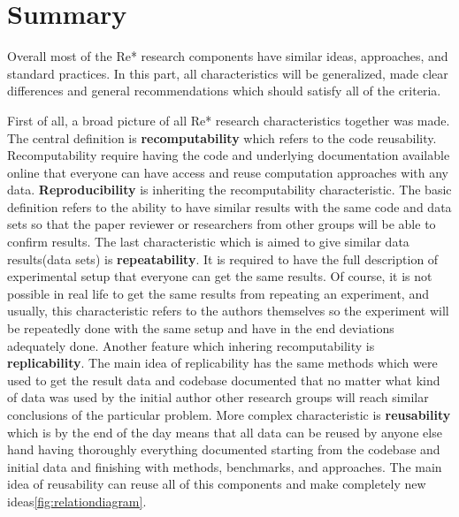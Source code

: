 \chapter{Summary}
Overall most of the Re* research components have similar ideas, approaches, and standard practices. In this part, all characteristics will be generalized, made clear differences and general recommendations which should satisfy all of the criteria.\par
First of all, a broad picture of all Re* research characteristics together was made. The central definition is \textbf{recomputability} which refers to the code reusability. Recomputability require having the code and underlying documentation available online that everyone can have access and reuse computation approaches with any data. \textbf{Reproducibility} is inheriting the recomputability characteristic. The basic definition refers to the ability to have similar results with the same code and data sets so that the paper reviewer or researchers from other groups will be able to confirm results. The last characteristic which is aimed to give similar data results(data sets) is \textbf{repeatability}. It is required to have the full description of experimental setup that everyone can get the same results. Of course, it is not possible in real life to get the same results from repeating an experiment, and usually, this characteristic refers to the authors themselves so the experiment will be repeatedly done with the same setup and have in the end deviations adequately done.  Another feature which inhering recomputability is \textbf{replicability}. The main idea of replicability has the same methods which were used to get the result data and codebase documented that no matter what kind of data was used by the initial author other research groups will reach similar conclusions of the particular problem. More complex characteristic is \textbf{reusability} which is by the end of the day means that all data can be reused by anyone else hand having thoroughly everything documented starting from the codebase and initial data and finishing with methods, benchmarks, and approaches. The main idea of reusability can reuse all of this components and make completely new ideas\ref{fig:relationdiagram}.\par
